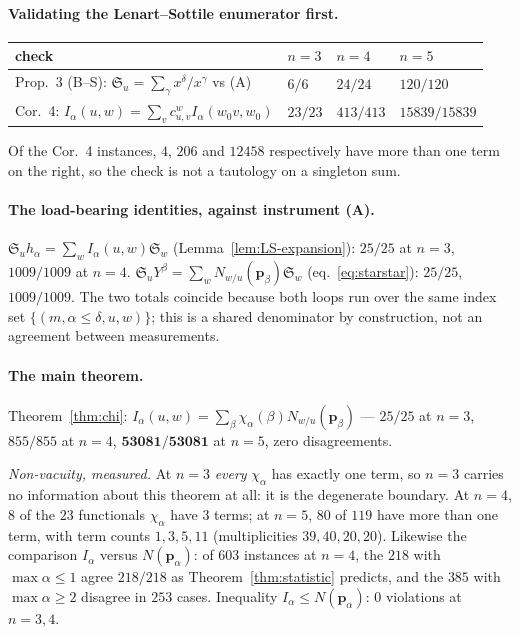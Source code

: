 \documentclass[11pt]{article}
\theoremstyle{plain}
\theoremstyle{definition}
\newcommand{\Sch}{\mathfrak{S}}
\newcommand{\pv}{\mathbf{p}}
\begin{document}
\paragraph{Validating the Lenart--Sottile enumerator first.}
\begin{center}
\begin{tabular}{llll}
\hline
check & $n=3$ & $n=4$ & $n=5$\\
\hline
Prop.~3 (B--S): $\Sch_u=\sum_\gamma x^{\delta}/x^{\gamma}$ vs (A)
  & $6/6$ & $24/24$ & $120/120$\\
Cor.~4: $I_\alpha(u,w)=\sum_v c^w_{u,v}I_\alpha(w_0v,w_0)$
  & $23/23$ & $413/413$ & $15839/15839$\\
\hline
\end{tabular}
\end{center}
Of the Cor.~4 instances, $4$, $206$ and $12458$ respectively have more than one
term on the right, so the check is not a tautology on a singleton sum.

\paragraph{The load-bearing identities, against instrument (A).}
$\Sch_u h_\alpha=\sum_w I_\alpha(u,w)\Sch_w$ (Lemma~\ref{lem:LS-expansion}):
$25/25$ at $n=3$, $1009/1009$ at $n=4$.
$\Sch_u Y^\beta=\sum_w N_{w/u}(\pv_\beta)\Sch_w$ (eq.~\eqref{eq:starstar}):
$25/25$, $1009/1009$. The two totals coincide because both loops run over the
same index set $\{(m,\alpha\le\delta,u,w)\}$; this is a shared denominator by
construction, not an agreement between measurements.

\paragraph{The main theorem.} Theorem~\ref{thm:chi}:
$I_\alpha(u,w)=\sum_\beta\chi_\alpha(\beta)N_{w/u}(\pv_\beta)$ --- $25/25$ at
$n=3$, $855/855$ at $n=4$, $\mathbf{53081/53081}$ at $n=5$, zero disagreements.

\emph{Non-vacuity, measured.} At $n=3$ \emph{every} $\chi_\alpha$ has exactly
one term, so $n=3$ carries no information about this theorem at all: it is the
degenerate boundary. At $n=4$, $8$ of the $23$ functionals $\chi_\alpha$ have
$3$ terms; at $n=5$, $80$ of $119$ have more than one term, with term counts
$1,3,5,11$ (multiplicities $39,40,20,20$). Likewise the comparison
$I_\alpha$ versus $N(\pv_\alpha)$: of $603$ instances at $n=4$, the $218$ with
$\max\alpha\le1$ agree $218/218$ as Theorem~\ref{thm:statistic} predicts, and
the $385$ with $\max\alpha\ge2$ disagree in $253$ cases. Inequality
$I_\alpha\le N(\pv_\alpha)$: $0$ violations at $n=3,4$.
\end{document}
